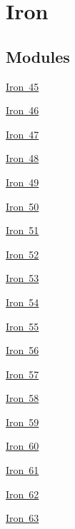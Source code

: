 \hypertarget{group___isotope_const-_iron}{}\section{Iron}
\label{group___isotope_const-_iron}
\subsection*{Modules}
\begin{DoxyCompactItemize}
\item 
\mbox{\hyperlink{group___isotope_const-_iron-_fe45}{Iron 45}}
\item 
\mbox{\hyperlink{group___isotope_const-_iron-_fe46}{Iron 46}}
\item 
\mbox{\hyperlink{group___isotope_const-_iron-_fe47}{Iron 47}}
\item 
\mbox{\hyperlink{group___isotope_const-_iron-_fe48}{Iron 48}}
\item 
\mbox{\hyperlink{group___isotope_const-_iron-_fe49}{Iron 49}}
\item 
\mbox{\hyperlink{group___isotope_const-_iron-_fe50}{Iron 50}}
\item 
\mbox{\hyperlink{group___isotope_const-_iron-_fe51}{Iron 51}}
\item 
\mbox{\hyperlink{group___isotope_const-_iron-_fe52}{Iron 52}}
\item 
\mbox{\hyperlink{group___isotope_const-_iron-_fe53}{Iron 53}}
\item 
\mbox{\hyperlink{group___isotope_const-_iron-_fe54}{Iron 54}}
\item 
\mbox{\hyperlink{group___isotope_const-_iron-_fe55}{Iron 55}}
\item 
\mbox{\hyperlink{group___isotope_const-_iron-_fe56}{Iron 56}}
\item 
\mbox{\hyperlink{group___isotope_const-_iron-_fe57}{Iron 57}}
\item 
\mbox{\hyperlink{group___isotope_const-_iron-_fe58}{Iron 58}}
\item 
\mbox{\hyperlink{group___isotope_const-_iron-_fe59}{Iron 59}}
\item 
\mbox{\hyperlink{group___isotope_const-_iron-_fe60}{Iron 60}}
\item 
\mbox{\hyperlink{group___isotope_const-_iron-_fe61}{Iron 61}}
\item 
\mbox{\hyperlink{group___isotope_const-_iron-_fe62}{Iron 62}}
\item 
\mbox{\hyperlink{group___isotope_const-_iron-_fe63}{Iron 63}}
\item 

\end{DoxyCompactItemize}
